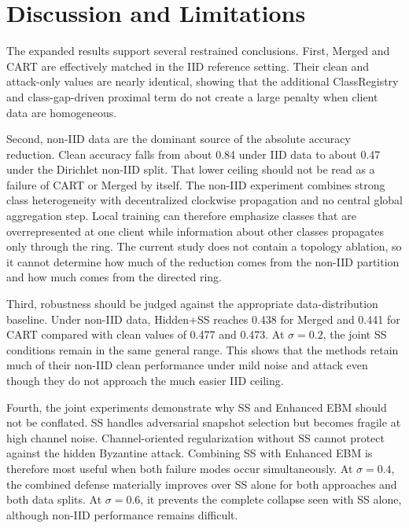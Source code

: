 \documentclass[conference]{IEEEtran}
\begin{document}
\FloatBarrier
\section{Discussion and Limitations}

The expanded results support several restrained conclusions. First, Merged and CART are effectively matched in the IID reference setting. Their clean and attack-only values are nearly identical, showing that the additional ClassRegistry and class-gap-driven proximal term do not create a large penalty when client data are homogeneous.

Second, non-IID data are the dominant source of the absolute accuracy reduction. Clean accuracy falls from about 0.84 under IID data to about 0.47 under the Dirichlet non-IID split. That lower ceiling should not be read as a failure of CART or Merged by itself. The non-IID experiment combines strong class heterogeneity with decentralized clockwise propagation and no central global aggregation step. Local training can therefore emphasize classes that are overrepresented at one client while information about other classes propagates only through the ring. The current study does not contain a topology ablation, so it cannot determine how much of the reduction comes from the non-IID partition and how much comes from the directed ring.

Third, robustness should be judged against the appropriate data-distribution baseline. Under non-IID data, Hidden+SS reaches 0.438 for Merged and 0.441 for CART compared with clean values of 0.477 and 0.473. At $\sigma=0.2$, the joint SS conditions remain in the same general range. This shows that the methods retain much of their non-IID clean performance under mild noise and attack even though they do not approach the much easier IID ceiling.

Fourth, the joint experiments demonstrate why SS and Enhanced EBM should not be conflated. SS handles adversarial snapshot selection but becomes fragile at high channel noise. Channel-oriented regularization without SS cannot protect against the hidden Byzantine attack. Combining SS with Enhanced EBM is therefore most useful when both failure modes occur simultaneously. At $\sigma=0.4$, the combined defense materially improves over SS alone for both approaches and both data splits. At $\sigma=0.6$, it prevents the complete collapse seen with SS alone, although non-IID performance remains difficult.
\end{document}
